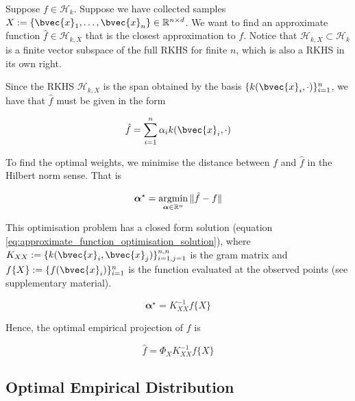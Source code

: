 \documentclass[twoside]{article} \usepackage{aistats2017}
\newcommand{\argmin}{\operatornamewithlimits{argmin}}
\begin{document}
		Suppose $f \in \mathcal{H}_{k}$. Suppose we have collected samples $X := \{\bvec{x}_{1}, \dots, \bvec{x}_{n}\} \in \mathbb{R}^{n \times d}$. We want to find an approximate function $\hat{f} \in \mathcal{H}_{k, X}$ that is the closest approximation to $f$. Notice that $\mathcal{H}_{k, X} \subset \mathcal{H}_{k}$ is a finite vector subspace of the full RKHS for finite $n$, which is also a RKHS in its own right.
		
		Since the RKHS $\mathcal{H}_{k, X}$ is the span obtained by the basis $\{k(\bvec{x}_{i}, \cdot)\}_{i = 1}^{n}$, we have that $\hat{f}$ must be given in the form
		
		\begin{equation}
			\hat{f} = \sum_{i = 1}^{n} \alpha_{i} k(\bvec{x}_{i}, \cdot)
		\label{eq:approximate_function_form}
		\end{equation}
		
		To find the optimal weights, we minimise the distance between $f$ and $\hat{f}$ in the Hilbert norm sense. That is
			
		\begin{equation}
			\bm{\alpha}^{\star} = \argmin_{\bm{\alpha} \in \mathbb{R}^{n}} \Vert \hat{f} - f \Vert
		\label{eq:approximate_embedding_optimisation}
		\end{equation}
		
		This optimisation problem has a closed form solution (equation \ref{eq:approximate_function_optimisation_solution}), where $K_{X X} := \{k(\bvec{x}_{i}, \bvec{x}_{j})\}_{i = 1, j = 1}^{n, n}$ is the gram matrix and $f\{X\} := \{f(\bvec{x}_{i})\}_{i = 1}^{n}$ is the function evaluated at the observed points (see supplementary material).
		
		\begin{equation}
			\bm{\alpha}^{\star} = K_{X X}^{-1} f\{X\}
		\label{eq:approximate_function_optimisation_solution}
		\end{equation}
		
		Hence, the optimal empirical projection of $f$ is

		\begin{equation}
			\hat{f} = \Phi_{X} K_{X X}^{-1} f\{X\}
		\label{eq:empirical_projection}
		\end{equation}

		
	\subsection{Optimal Empirical Distribution}
		
\end{document}
